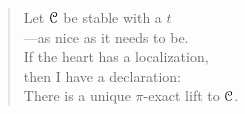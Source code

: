 
\thispagestyle{plain}

\vspace*{7cm}

\begin{verse}
    \hspace{8em}Let $\EuScript{C}$ be stable with a $t$ \\
    \vspace{5pt}
    \hspace{8em}---as nice as it needs to be. \\
    \vspace{5pt}
    \hspace{8em}If the heart has a localization, \\
    \vspace{5pt}
    \hspace{8em}then I have a declaration: \\
    \vspace{5pt}
    \hspace{8em}There is a unique $\pi$-exact lift to $\EuScript{C}$. 

\end{verse}